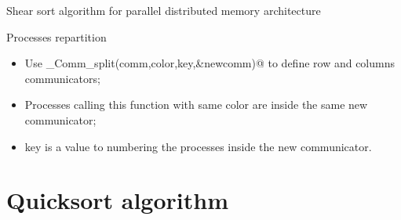 \documentclass[compress,10pt,aspectratio=169]{beamer}
\begin{document}
\begin{frame}[fragile]{Shear sort algorithm for parallel distributed memory architecture}
\begin{block}{\small Processes repartition}
\begin{multicols}{2}
    \begin{minipage}{0.5\textwidth}
        \begin{itemize}
            \item Use \verb@MPI_Comm_split(comm,color,key,&newcomm)@ to define row and columns communicators;
            \item Processes calling this function with same color are inside the same new communicator;
            \item key is a value to numbering the processes inside the new communicator.
        \end{itemize}
    \end{minipage}
\end{multicols}
    \end{block}
\end{frame}

\section{Quicksort algorithm}
\end{document}
